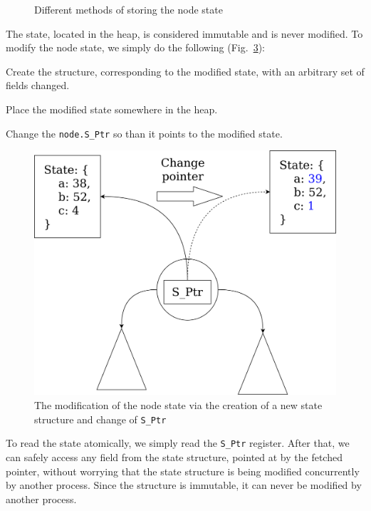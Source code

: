 \documentclass[times, dvipsnames,%
               languages={russian,english} %
              ]{itmo-student-thesis}
\begin{document}
\begin{figure}[H]
\begin{subfigure}[b]{0.45\linewidth}
          \label{state-storing-pic}
     \end{subfigure}
    \caption{Different methods of storing the node state}
    \label{remove-last-pic}
\end{figure}

The state, located in the heap, is considered immutable and is never modified. To modify the node state, we simply do the following (Fig.~\ref{state-change-pic}):

\begin{nenum}
    \item Create the structure, corresponding to the modified state, with an arbitrary set of fields changed.
    \item Place the modified state somewhere in the heap.
    \item Change the \texttt{node.S\_Ptr} so than it points to the modified state.
\end{nenum}

\begin{figure}[H]
  \centering
  \caption{The modification of the node state via the creation of a new state structure and change of \texttt{S\_Ptr}}
  \label{state-change-pic}
  \includegraphics[width=0.7\linewidth]{pics/state-change.png}
\end{figure}

To read the state atomically, we simply read the \texttt{S\_Ptr} register. After that, we can safely access any field from the state structure, pointed at by the fetched pointer, without worrying that the state structure is being modified concurrently by another process. Since the structure is immutable, it can never be modified by another process.
\end{document}
